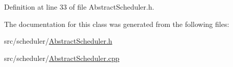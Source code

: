 Definition at line 33 of file Abstract\+Scheduler.\+h.



The documentation for this class was generated from the following files\+:\begin{DoxyCompactItemize}
\item 
src/scheduler/\hyperlink{_abstract_scheduler_8h}{Abstract\+Scheduler.\+h}\item 
src/scheduler/\hyperlink{_abstract_scheduler_8cpp}{Abstract\+Scheduler.\+cpp}\end{DoxyCompactItemize}

